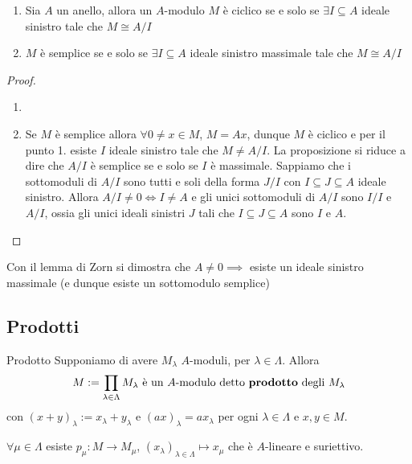 \begin{proposition}{} \( \) 
\begin{enumerate}[label = \arabic*.]
    \item Sia \(A\) un anello, allora un \(A\)-modulo \(M\) è ciclico se e solo se \(\exists I \subseteq A \) ideale sinistro tale che \(M \cong A / I\) 
    \item \(M\) è semplice se e solo se \(\exists  I \subseteq A \) ideale
        sinistro massimale tale che \(M \cong A/I\) 
\end{enumerate}
\end{proposition}
\begin{proof}{}
\begin{enumerate}[label = \arabic*.]
    \item 
    \item Se \(M\) è semplice allora \(\forall 0 \neq x \in M\), \(M = Ax\),
        dunque \(M\) è ciclico e per il punto 1. esiste \(I\) ideale sinistro
        tale che \(M \neq A/I\). La proposizione si riduce a dire che \(A/I\) è
        semplice se e solo se \(I\) è massimale. Sappiamo che i sottomoduli di
        \(A/I\) sono tutti e soli della forma \(J /I\) con \(I \subseteq J \subseteq A  \) ideale sinistro.
        Allora \(A / I \neq 0 \iff I \neq A\) e gli unici sottomoduli di \(A / I \) sono \(I / I\) e \(A / I\), ossia gli unici ideali sinistri \(J\) tali che \(I \subseteq J \subseteq A  \) sono \(I\) e \(A\).
\end{enumerate}
\end{proof}
\begin{remark}{}
    Con il lemma di Zorn si dimostra che \(A \neq 0 \implies \) esiste un ideale
    sinistro massimale (e dunque esiste un sottomodulo semplice)
\end{remark}

\subsection{Prodotti}
\begin{definition}{Prodotto}
Supponiamo di avere \(M_{\lambda} \) \(A\)-moduli, per \(\lambda \in \Lambda\). Allora 
\[
  M := \prod_{\lambda \in \Lambda} M_{\lambda} \text{ è un \(A\)-modulo detto \textbf{prodotto} degli \(M_{\lambda}\)}
\]
con \({(x + y)}_\lambda := x_\lambda + y_\lambda\)  e \({(ax)}_\lambda =
ax_\lambda\) per ogni \(\lambda \in \Lambda\) e \(x, y \in M\).

\(\forall \mu \in \Lambda\) esiste \(p_\mu : M \to M_\mu\), \({(x_{\lambda})}_{\lambda \in \Lambda} \mapsto x_\mu  \) che è \(A\)-lineare e suriettivo.
\end{definition}

